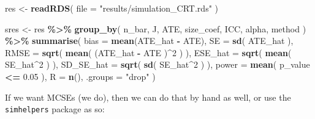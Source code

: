 \documentclass[
]{book}
\newenvironment{Shaded}{\begin{snugshade}}{\end{snugshade}}
\newcommand{\AttributeTok}[1]{\textcolor[rgb]{0.13,0.29,0.53}{#1}}
\newcommand{\DecValTok}[1]{\textcolor[rgb]{0.00,0.00,0.81}{#1}}
\newcommand{\FloatTok}[1]{\textcolor[rgb]{0.00,0.00,0.81}{#1}}
\newcommand{\FunctionTok}[1]{\textcolor[rgb]{0.13,0.29,0.53}{\textbf{#1}}}
\newcommand{\NormalTok}[1]{#1}
\newcommand{\OtherTok}[1]{\textcolor[rgb]{0.56,0.35,0.01}{#1}}
\newcommand{\SpecialCharTok}[1]{\textcolor[rgb]{0.81,0.36,0.00}{\textbf{#1}}}
\newcommand{\StringTok}[1]{\textcolor[rgb]{0.31,0.60,0.02}{#1}}
\begin{document}
\begin{Shaded}
\begin{Highlighting}[]
\NormalTok{res }\OtherTok{\textless{}{-}} \FunctionTok{readRDS}\NormalTok{( }\AttributeTok{file =} \StringTok{"results/simulation\_CRT.rds"}\NormalTok{ )}

\NormalTok{sres }\OtherTok{\textless{}{-}} 
\NormalTok{  res }\SpecialCharTok{\%\textgreater{}\%} 
  \FunctionTok{group\_by}\NormalTok{( n\_bar, J, ATE, size\_coef, ICC, alpha, method ) }\SpecialCharTok{\%\textgreater{}\%}
  \FunctionTok{summarise}\NormalTok{( }
    \AttributeTok{bias =} \FunctionTok{mean}\NormalTok{(ATE\_hat }\SpecialCharTok{{-}}\NormalTok{ ATE),}
    \AttributeTok{SE =} \FunctionTok{sd}\NormalTok{( ATE\_hat ),}
    \AttributeTok{RMSE =} \FunctionTok{sqrt}\NormalTok{( }\FunctionTok{mean}\NormalTok{( (ATE\_hat }\SpecialCharTok{{-}}\NormalTok{ ATE )}\SpecialCharTok{\^{}}\DecValTok{2}\NormalTok{ ) ),}
    \AttributeTok{ESE\_hat =} \FunctionTok{sqrt}\NormalTok{( }\FunctionTok{mean}\NormalTok{( SE\_hat}\SpecialCharTok{\^{}}\DecValTok{2}\NormalTok{ ) ),}
    \AttributeTok{SD\_SE\_hat =} \FunctionTok{sqrt}\NormalTok{( }\FunctionTok{sd}\NormalTok{( SE\_hat}\SpecialCharTok{\^{}}\DecValTok{2}\NormalTok{ ) ),}
    \AttributeTok{power =} \FunctionTok{mean}\NormalTok{( p\_value }\SpecialCharTok{\textless{}=} \FloatTok{0.05}\NormalTok{ ),}
    \AttributeTok{R =} \FunctionTok{n}\NormalTok{(),}
    \AttributeTok{.groups =} \StringTok{"drop"}
\NormalTok{  )}
\end{Highlighting}
\end{Shaded}

If we want MCSEs (we do), then we can do that by hand as well, or use the \texttt{simhelpers} package as so:
\end{document}

